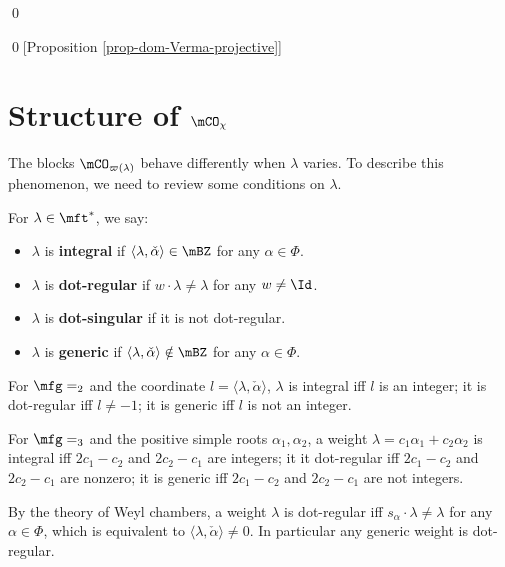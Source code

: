 	\qed

	\qed[Proposition \ref{prop-dom-Verma-projective}]

	\section{Structure of \texorpdfstring{$\mCO_\chi$}{Ochi}}

	The blocks $\mCO_{\varpi(\lambda)}$ behave differently when $\lambda$ varies. To describe this phenomenon, we need to review some conditions on $\lambda$.

	\begin{defn}
		\label{defn-integral-weight}
		For $\lambda \in \mft^*$, we say:
		\begin{itemize}
			\item 
				$\lambda$ is \textbf{integral} if $\langle \lambda,\check\alpha \rangle \in \mBZ$ for any $\alpha\in \Phi$.
			\item 
				$\lambda$ is \textbf{dot-regular} if $w\cdot \lambda \neq \lambda$ for any $w\neq \Id$.
			\item
				$\lambda$ is \textbf{dot-singular} if it is not dot-regular.
			\item
				$\lambda$ is \textbf{generic} if $\langle \lambda,\check\alpha \rangle \notin \mBZ$ for any $\alpha\in \Phi$.
		\end{itemize}
	\end{defn}

	\begin{exam}
		For $\mfg=\sl_2$ and the coordinate $l=\langle \lambda,\check\alpha\rangle$, $\lambda$ is integral iff $l$ is an integer; it is dot-regular iff $l\neq -1$; it is generic iff $l$ is not an integer.
	\end{exam}

	\begin{exam}
		For $\mfg=\sl_3$ and the positive simple roots $\alpha_1,\alpha_2$, a weight $\lambda= c_1\alpha_1+c_2\alpha_2$ is integral iff $2c_1-c_2$ and $2c_2-c_1$ are integers; it it dot-regular iff $2c_1-c_2$ and $2c_2-c_1$ are nonzero; it is generic iff $2c_1-c_2$ and $2c_2-c_1$ are not integers.
	\end{exam}

	\begin{rem}
		By the theory of Weyl chambers, a weight $\lambda$ is dot-regular iff $s_\alpha\cdot \lambda \neq \lambda$ for any $\alpha\in \Phi$, which is equivalent to $\langle \lambda,\check\alpha \rangle \neq 0$. In particular any generic weight is dot-regular.
	\end{rem}

